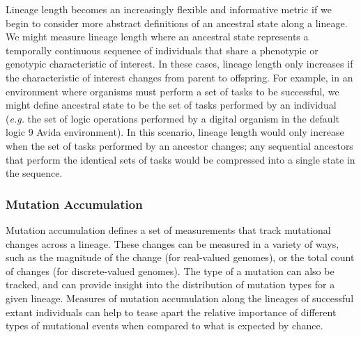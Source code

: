 \documentclass[letterpaper]{article}
\begin{document}
Lineage length becomes an increasingly flexible and informative metric if we begin to consider more abstract definitions of an ancestral state along a lineage. 
We might measure lineage length where an ancestral state represents a temporally continuous sequence of individuals that share a phenotypic or genotypic characteristic of interest. In these cases, lineage length only increases if the characteristic of interest changes from parent to offspring. For example, in an environment where organisms must perform a set of tasks to be successful, we might define ancestral state to be the set of tasks performed by an individual (\textit{e.g.} the set of logic operations performed by a digital organism in the default logic 9 Avida environment). In this scenario, lineage length would only increase when the set of tasks performed by an ancestor changes; any sequential ancestors that perform the identical sets of tasks would be compressed into a single state in the sequence. 

\subsubsection{Mutation Accumulation}
Mutation accumulation defines a set of measurements that track mutational changes across a lineage. These changes can be measured in a variety of ways, such as the magnitude of the change (for real-valued genomes), or the total count of changes (for discrete-valued genomes). The type of a mutation can also be tracked, and can provide insight into the distribution of mutation types for a given lineage. Measures of mutation accumulation along the lineages of successful extant individuals can help to tease apart the relative importance of different types of mutational events when compared to what is expected by chance. 
\end{document}
